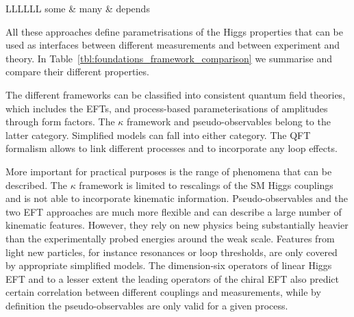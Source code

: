 \begin{table}
\begin{tabularx}{\textwidth}{LLLLLL}
    some & 
    many &
    depends \\
    \bottomrule
  \end{tabularx}
  \caption[Comparison of different parametrisations of Higgs properties]{Comparison
    of different parametrisations of Higgs properties. The upper part of the table
    focuses on the theoretical foundation, the lower the phenomenology.
    Since ``simplified models'' describe a rather general idea, many
    details depend on the specific realisation.}
  \label{tbl:foundations_framework_comparison}
\end{table}

All these approaches define parametrisations of the Higgs properties
that can be used as interfaces between different measurements and
between experiment and theory. In
Table~\ref{tbl:foundations_framework_comparison} we summarise and
compare their different properties.

The different frameworks can be classified into consistent quantum
field theories, which includes the EFTs, and process-based
parameterisations of amplitudes through form factors. The $\kappa$
framework and pseudo-observables belong to the latter
category. Simplified models can fall into either category. The QFT
formalism allows to link different processes and to incorporate any
loop effects.

More important for practical purposes is the range of phenomena that
can be described. The $\kappa$ framework is limited to rescalings of
the SM Higgs couplings and is not able to incorporate kinematic
information. Pseudo-observables and the two EFT approaches are much
more flexible and can describe a large number of kinematic
features. However, they rely on new physics being substantially
heavier than the experimentally probed energies around the weak
scale. Features from light new particles, for instance resonances or
loop thresholds, are only covered by appropriate simplified
models. The dimension-six operators of linear Higgs EFT and to a
lesser extent the leading operators of the chiral EFT also predict
certain correlation between different couplings and measurements,
while by definition the pseudo-observables are only valid for a given
process.

